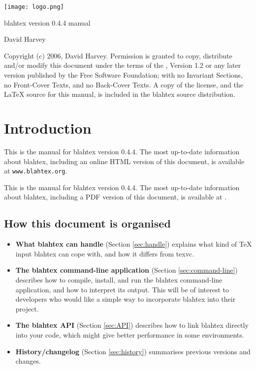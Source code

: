 \documentclass{article}
\newcommand{\blahtexversion}{0.4.4}
\begin{document}
\thispagestyle{empty}

\begin{center}
\texttt{[image: logo.png]}

\vskip 1.6cm

{\Huge blahtex version \blahtexversion{} manual}

\vskip 0.8cm

{\Large David Harvey}
\end{center}

\vskip 1.6cm

{\footnotesize
Copyright (c) 2006, David Harvey. Permission is granted to copy, distribute
and/or modify this document under the terms of the
,
Version 1.2 or any later version published by the Free Software Foundation;
with no Invariant Sections, no Front-Cover Texts, and no Back-Cover Texts.
A copy of the license, and the \LaTeX{} source for this manual, is included
in the blahtex source distribution.
}

\section{Introduction}

\begin{latexonly}
This is the manual for blahtex version \blahtexversion. The most up-to-date information about blahtex, including
an online HTML version of this document, is available at \texttt{www.blahtex.org}.
\end{latexonly}

\begin{htmlonly}
This is the manual for blahtex version \blahtexversion. The most up-to-date information about blahtex, including
a PDF version of this document, is available at .
\end{htmlonly}

\subsection{How this document is organised}

\begin{itemize}
\item {\bf What blahtex can handle} (Section \ref{sec:handle}) explains what kind of \TeX{} input blahtex can cope with, and how it differs from texvc.
\item {\bf The blahtex command-line application} (Section \ref{sec:command-line}) describes how to compile, install, and run the blahtex command-line application, and how to interpret its output. This will be of interest to developers who would like a simple way to incorporate blahtex into their project.
\item {\bf The blahtex API} (Section \ref{sec:API}) describes how to link blahtex directly into your code, which might give better performance in some environments.
\item {\bf History/changelog} (Section \ref{sec:history}) summarises previous versions and changes.
\end{itemize}
\end{document}
